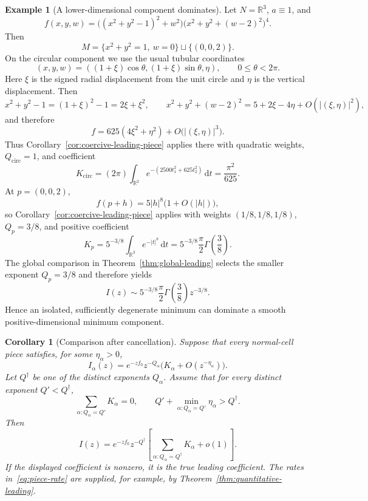 \documentclass[11pt]{amsart}
\numberwithin{equation}{section}
\newtheorem{corollary}[theorem]{Corollary}
\theoremstyle{definition}
\newtheorem{example}[theorem]{Example}
\theoremstyle{remark}
\newcommand{\R}{\mathbb{R}}
\newcommand{\dd}{\,\mathrm{d}}
\begin{document}
\begin{example}[A lower-dimensional component dominates]\label{ex:lower-dim}
Let $N=\R^3$, $a\equiv1$, and
\[
 f(x,y,w)=\bigl((x^2+y^2-1)^2+w^2\bigr)
          \bigl(x^2+y^2+(w-2)^2\bigr)^4.
\]
Then
\[
 M=\{x^2+y^2=1,\ w=0\}\sqcup\{(0,0,2)\}.
\]
On the circular component we use the usual tubular coordinates
\[
 (x,y,w)=((1+\xi)\cos\theta,(1+\xi)\sin\theta,\eta),
 \qquad 0\le\theta<2\pi.
\]
Here $\xi$ is the signed radial displacement from the unit circle and $\eta$ is
the vertical displacement.  Then
\[
 x^2+y^2-1=(1+\xi)^2-1=2\xi+\xi^2,
 \qquad
 x^2+y^2+(w-2)^2=5+2\xi-4\eta+O(|(\xi,\eta)|^2),
\]
and therefore
\[
 f=625(4\xi^2+\eta^2)+O\bigl(|(\xi,\eta)|^3\bigr).
\]
Thus Corollary~\ref{cor:coercive-leading-piece} applies there with quadratic weights,
$Q_{\mathrm{circ}}=1$, and coefficient
\[
 K_{\mathrm{circ}}
 =(2\pi)\int_{\R^2}e^{-(2500t_1^2+625t_2^2)}\dd t
 =\frac{\pi^2}{625}.
\]
At $p=(0,0,2)$,
\[
 f(p+h)=5|h|^8\bigl(1+O(|h|)\bigr),
\]
so Corollary~\ref{cor:coercive-leading-piece} applies with weights
$(1/8,1/8,1/8)$,
$Q_p=3/8$, and positive coefficient
\[
 K_p
 =5^{-3/8}\int_{\R^3}e^{-|t|^8}\dd t
 =5^{-3/8}\frac{\pi}{2}\Gamma\!\left(\frac38\right).
\]
The global comparison in Theorem~\ref{thm:global-leading} selects the smaller
exponent $Q_p=3/8$ and therefore yields
\[
 I(z)\sim
 5^{-3/8}\frac{\pi}{2}\Gamma\!\left(\frac38\right)z^{-3/8}.
\]
Hence an isolated, sufficiently degenerate minimum can dominate a smooth
positive-dimensional minimum component.
\end{example}

\begin{corollary}[Comparison after cancellation]\label{cor:comparison-after-cancellation}
Suppose that every normal-cell piece satisfies, for some $\eta_\alpha>0$,
\begin{equation}\label{eq:piece-rate}
 I_\alpha(z)=e^{-zf_0}z^{-Q_\alpha}
 \bigl(K_\alpha+O(z^{-\eta_\alpha})\bigr).
\end{equation}
Let $Q^\dagger$ be one of the distinct exponents $Q_\alpha$.  Assume that for
every distinct exponent $Q'<Q^\dagger$,
\begin{equation}\label{eq:lower-level-cancellation}
 \sum_{\alpha:Q_\alpha=Q'}K_\alpha=0,
 \qquad
 Q'+\min_{\alpha:Q_\alpha=Q'}\eta_\alpha>Q^\dagger.
\end{equation}
Then
\begin{equation}\label{eq:comparison-after-cancellation}
 I(z)=e^{-zf_0}z^{-Q^\dagger}
 \left[\sum_{\alpha:Q_\alpha=Q^\dagger}K_\alpha+o(1)\right].
\end{equation}
If the displayed coefficient is nonzero, it is the true leading coefficient.
The rates in~\eqref{eq:piece-rate} are supplied, for example, by
Theorem~\ref{thm:quantitative-leading}.
\end{corollary}
\end{document}
